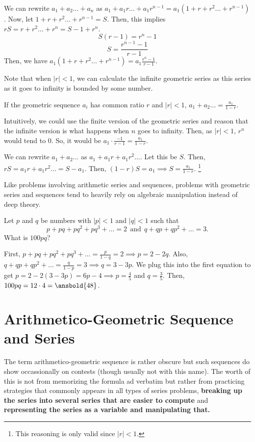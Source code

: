 \documentclass[11pt]{article}
\begin{document}
\begin{pro}
We can rewrite $a_{1}+a_{2}\ldots + a_{n}$ as $a_{1}+a_{1}r\ldots + a_{1}r^{n-1}=a_{1}(1+r+r^2\ldots + r^{n-1})$. Now, let $1+r+r^2\ldots + r^{n-1}=S$. Then, this implies $rS=r+r^2\ldots + r^{n}=S-1+r^{n}$.
$$S(r-1)=r^{n}-1$$
$$S=\frac{r^{n-1}-1}{r-1}$$
Then, we have $a_{1}(1+r+r^2\ldots + r^{n-1})=a_{1}\frac{r^{n}-1}{r-1}$.
\end{pro}

Note that when $|r|<1$, we can calculate the infinite geometric series as this series as it goes to infinity is bounded by some number.
\begin{theo}
If the geometric sequence $a_{i}$ has common ratio $r$ and $|r|<1$, $a_{1}+a_{2}\ldots = \frac{a_{1}}{1-r}$.
\end{theo}

Intuitively, we could use the finite version of the geometric series and reason that the infinite version is what happens when $n$ goes to infinity. Then, as $|r|<1$, $r^{n}$ would tend to $0$. So, it would be $a_{1}\cdot \frac{-1}{r-1}=\frac{a_{1}}{1-r}$.

\begin{pro}
We can rewrite $a_{1}+a_{2}\ldots $ as $a_{1}+a_{1}r+a_{1}r^2\ldots$. Let this be $S$. Then, $rS=a_{1}r+a_{1}r^2\ldots = S-a_{1}$. Then, $(1-r)S=a_{1}\implies S =\frac{a_{1}}{1-r}$. \footnote{This reasoning is only valid since $|r|<1$.}
\end{pro}

Like problems involving arithmetic series and sequences, problems with geometric series and sequences tend to heavily rely on algebraic manipulation instead of deep theory.
\begin{exam}
Let $p$ and $q$ be numbers with  $|p| <1$ and $|q| <1$ such that \[p+pq+pq^2+pq^3 + \dots = 2  ~~\text{and} ~~ q + qp + qp^2 + \dots = 3.\] What is $100pq$?
\end{exam}

\begin{sol}
First, $p+pq+pq^2+pq^3 + \dots = \frac{p}{1-q}=2\implies p=2-2q$. Also, $q+qp+qp^2 + \dots = \frac{q}{1-p}=3\implies q=3-3p$. We plug this into the first equation to get $p=2-2(3-3p)=6p-4\implies p = \frac{4}{5}$ and $q=\frac{3}{5}$. Then, $100pq=12\cdot 4=\ansbold{48}$.
\end{sol}

\section{Arithmetico-Geometric Sequence and Series}
The term arithmetico-geometric sequence is rather obscure but such sequences do show occassionally on contests (though usually not with this name). The worth of this is not from memorizing the formula ad verbatim but rather from practicing strategies that commonly appears in all types of series problems, \textbf{breaking up the series into several series that are easier to compute} and \textbf{representing the series as a variable and manipulating that.}
\end{document}
